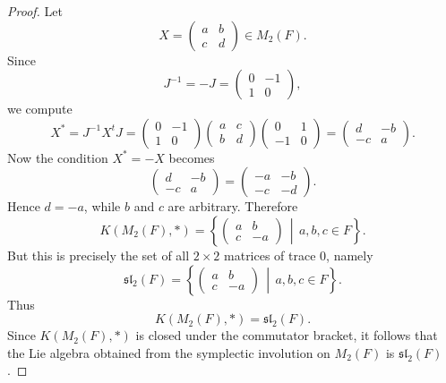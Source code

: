 \documentclass[11pt, a4paper]{report}
\begin{document}
    \begin{proof}
    Let
    \[
    X=\begin{pmatrix}a&b\\ c&d\end{pmatrix}\in M_{2}(F).
    \]
    Since
    \[
    J^{-1}=-J=\begin{pmatrix}0&-1\\1&0\end{pmatrix},
    \]
    we compute
    \[
    X^{*}
    =J^{-1}X^{t}J
    =\begin{pmatrix}0&-1\\1&0\end{pmatrix}
    \begin{pmatrix}a&c\\ b&d\end{pmatrix}
    \begin{pmatrix}0&1\\-1&0\end{pmatrix}
    =\begin{pmatrix}d&-b\\-c&a\end{pmatrix}.
    \]
    Now the condition $X^{*}=-X$ becomes
    \[
    \begin{pmatrix}d&-b\\-c&a\end{pmatrix}
    =
    \begin{pmatrix}-a&-b\\-c&-d\end{pmatrix}.
    \]
    Hence $d=-a$, while $b$ and $c$ are arbitrary. Therefore
    \[
    K(M_{2}(F),*)
    =
    \left\{
    \begin{pmatrix}
    a&b\\
    c&-a
    \end{pmatrix}
    \,\middle|\,
    a,b,c\in F
    \right\}.
    \]
    But this is precisely the set of all $2\times 2$ matrices of trace $0$, namely
    \[
    \mathfrak{sl}_{2}(F)
    =
    \left\{
    \begin{pmatrix}
    a&b\\
    c&-a
    \end{pmatrix}
    \,\middle|\,
    a,b,c\in F
    \right\}.
    \]
    Thus
    \[
    K(M_{2}(F),*)=\mathfrak{sl}_{2}(F).
    \]
    Since $K(M_{2}(F),*)$ is closed under the commutator bracket, it follows that the Lie algebra obtained from the symplectic involution on $M_{2}(F)$ is $\mathfrak{sl}_{2}(F)$.
    \end{proof}
\end{document}
